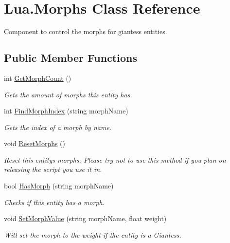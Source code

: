 \hypertarget{class_lua_1_1_morphs}{}\section{Lua.\+Morphs Class Reference}
\label{class_lua_1_1_morphs}


Component to control the morphs for giantess entities.  


\subsection*{Public Member Functions}
\begin{DoxyCompactItemize}
\item 
int \mbox{\hyperlink{class_lua_1_1_morphs_ad8c500e4a1dafbc13c39b762b860d49b}{Get\+Morph\+Count}} ()
\begin{DoxyCompactList}\small\item\em Gets the amount of morphs this entity has. \end{DoxyCompactList}\item 
int \mbox{\hyperlink{class_lua_1_1_morphs_aef69d4abbbf5f61ff1a2d4fe50737b4b}{Find\+Morph\+Index}} (string morph\+Name)
\begin{DoxyCompactList}\small\item\em Gets the index of a morph by name. \end{DoxyCompactList}\item 
void \mbox{\hyperlink{class_lua_1_1_morphs_a1fc28aa3c4e3aa18fd044f2420d9a32b}{Reset\+Morphs}} ()
\begin{DoxyCompactList}\small\item\em Reset this entity\textquotesingle{}s morphs. Please try not to use this method if you plan on releasing the script you use it in. \end{DoxyCompactList}\item 
bool \mbox{\hyperlink{class_lua_1_1_morphs_a223235569f3712c33c6975f26ec83549}{Has\+Morph}} (string morph\+Name)
\begin{DoxyCompactList}\small\item\em Checks if this entity has a morph. \end{DoxyCompactList}\item 
void \mbox{\hyperlink{class_lua_1_1_morphs_aefc93668891557c3c980857b3ee6aa0b}{Set\+Morph\+Value}} (string morph\+Name, float weight)
\begin{DoxyCompactList}\small\item\em Will set the morph to the weight if the entity is a Giantess. \end{DoxyCompactList}\item 

\end{DoxyCompactItemize}
